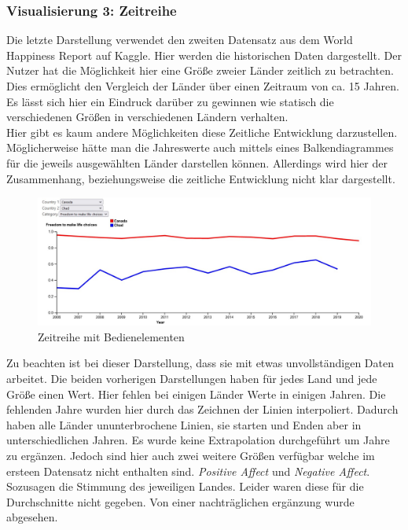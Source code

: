\subsubsection{Visualisierung 3: Zeitreihe}

Die letzte Darstellung verwendet den zweiten Datensatz aus dem World Happiness Report auf Kaggle. Hier werden die historischen Daten dargestellt. Der Nutzer hat die Möglichkeit hier eine Größe zweier Länder zeitlich zu betrachten. Dies ermöglicht den Vergleich der Länder über einen Zeitraum von ca. 15 Jahren. Es lässt sich hier ein Eindruck darüber zu gewinnen wie statisch die verschiedenen Größen in verschiedenen Ländern verhalten. \\

Hier gibt es kaum andere Möglichkeiten diese Zeitliche Entwicklung darzustellen. Möglicherweise hätte man die Jahreswerte auch mittels eines Balkendiagrammes für die jeweils ausgewählten Länder darstellen können. Allerdings wird hier der Zusammenhang, beziehungsweise die zeitliche Entwicklung nicht klar dargestellt. 

\begin{figure}[h]
 \centering
 \includegraphics[width = \textwidth]{img/timeseries.jpg}
 \caption{Zeitreihe mit Bedienelementen}
 \label{fig:timeseries}
\end{figure}

Zu beachten ist bei dieser Darstellung, dass sie mit etwas unvollständigen Daten arbeitet. Die beiden vorherigen Darstellungen haben für jedes Land und jede Größe einen Wert. Hier fehlen bei einigen Länder Werte in einigen Jahren. Die fehlenden Jahre wurden hier durch das Zeichnen der Linien interpoliert. Dadurch haben alle Länder ununterbrochene Linien, sie starten und Enden aber in unterschiedlichen Jahren. Es wurde keine Extrapolation durchgeführt um Jahre zu ergänzen. Jedoch sind hier auch zwei weitere Größen verfügbar welche im ersteen Datensatz nicht enthalten sind. \textit{Positive Affect} und \textit{Negative Affect}. Sozusagen die Stimmung des jeweiligen Landes. Leider waren diese für die Durchschnitte nicht gegeben. Von einer nachträglichen ergänzung wurde abgesehen. 

